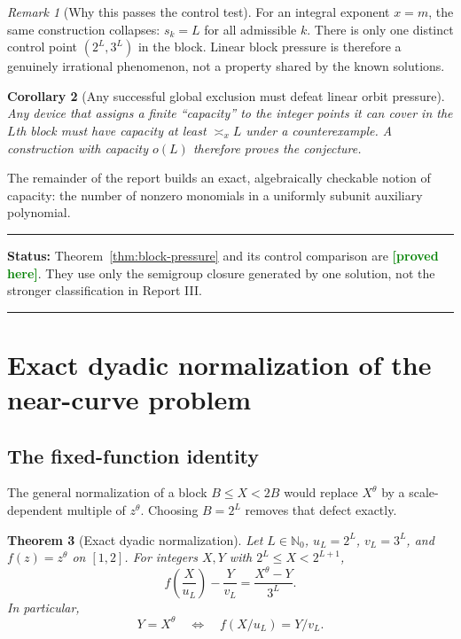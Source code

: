 \documentclass[11pt,oneside]{article}
\newtheorem{theorem}{Theorem}[section]
\newtheorem{corollary}[theorem]{Corollary}
\theoremstyle{definition}
\theoremstyle{remark}
\newtheorem{remark}[theorem]{Remark}
\newcommand{\Nzero}{\mathbb N_0}
\newcommand{\tht}{\theta}
\newcommand{\statusproved}{\textcolor{green}{\textbf{[proved here]}}}
\newenvironment{statusbox}[1]
{\begin{center}\begin{minipage}{0.95\textwidth}\raggedright\hrule
\vspace{0.45em}\textbf{Status:} #1\par\vspace{0.35em}}
{\vspace{0.35em}\hrule\end{minipage}\end{center}}
\begin{document}
\begin{remark}[Why this passes the control test]
For an integral exponent $x=m$, the same construction collapses: $s_k=L$ for all admissible $k$.
There is only one distinct control point $(2^L,3^L)$ in the block.  Linear block pressure is therefore
a genuinely irrational phenomenon, not a property shared by the known solutions.
\end{remark}

\begin{corollary}[Any successful global exclusion must defeat linear orbit pressure]
\label{cor:linear-pressure}
Any device that assigns a finite ``capacity'' to the integer points it can cover in the $L$th block
must have capacity at least $\asymp_x L$ under a counterexample.  A construction with capacity
$o(L)$ therefore proves the conjecture.
\end{corollary}

The remainder of the report builds an exact, algebraically checkable notion of capacity: the number
of nonzero monomials in a uniformly subunit auxiliary polynomial.

\begin{statusbox}{Theorem~\ref{thm:block-pressure} and its control comparison are \statusproved.
They use only the semigroup closure generated by one solution, not the stronger classification in
Report III.}
\end{statusbox}

\section{Exact dyadic normalization of the near-curve problem}
\label{sec:dyadic}

\subsection{The fixed-function identity}

The general normalization of a block $B\le X<2B$ would replace $X^\tht$ by a scale-dependent
multiple of $z^\tht$.  Choosing $B=2^L$ removes that defect exactly.

\begin{theorem}[Exact dyadic normalization]
\label{thm:dyadic-normalization}
Let $L\in\Nzero$, $u_L=2^L$, $v_L=3^L$, and $f(z)=z^\tht$ on $[1,2]$.  For integers
$X,Y$ with $2^L\le X<2^{L+1}$,
\begin{equation}
  f\!\left(\frac{X}{u_L}\right)-\frac{Y}{v_L}
  =\frac{X^\tht-Y}{3^L}.
  \label{eq:exact-normalization}
\end{equation}
In particular,
\[
  Y=X^\tht
  \quad\Longleftrightarrow\quad
  f(X/u_L)=Y/v_L.
\]
\end{theorem}
\end{document}

